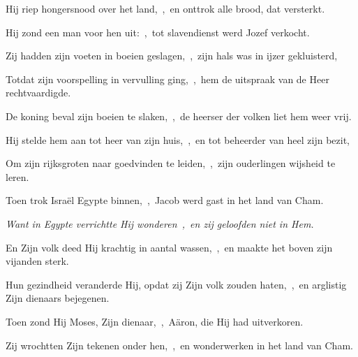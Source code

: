 \documentclass[12pt,twoside,a5paper]{article}
\begin{document}
\begin{halfparskip}
  Hij riep hongersnood over het land,~\sep\ en onttrok alle brood, dat versterkt.

  Hij zond een man voor hen uit:~\sep\ tot slavendienst werd Jozef verkocht.

  Zij hadden zijn voeten in boeien geslagen,~\sep\ zijn hals was in ijzer gekluisterd,

  Totdat zijn voorspelling in vervulling ging,~\sep\ hem de uitspraak van de Heer rechtvaardigde.

  De koning beval zijn boeien te slaken,~\sep\ de heerser der volken liet hem weer vrij.

  Hij stelde hem aan tot heer van zijn huis,~\sep\ en tot beheerder van heel zijn bezit,

  Om zijn rijksgroten naar goedvinden te leiden,~\sep\ zijn ouderlingen wijsheid te leren.
\end{halfparskip}


\begin{halfparskip}
  Toen trok Israël Egypte binnen,~\sep\ Jacob werd gast in het land van Cham.

  \emph{Want in Egypte verrichtte Hij wonderen~\sep\ en zij geloofden niet in Hem.}

  En Zijn volk deed Hij krachtig in aantal wassen,~\sep\ en maakte het boven zijn vijanden sterk.

  Hun gezindheid veranderde Hij, opdat zij Zijn volk zouden haten,~\sep\ en arglistig Zijn dienaars bejegenen.

  Toen zond Hij Moses, Zijn dienaar,~\sep\ Aäron, die Hij had uitverkoren.

  Zij wrochtten Zijn tekenen onder hen,~\sep\ en wonderwerken in het land van Cham.
\end{halfparskip}

\end{document}
